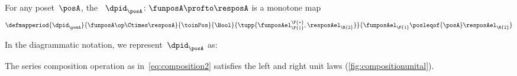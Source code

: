 \begin{definition}
    \label{def:dp-identity}
    For any poset~$\posA$, the \emph{}~$\dpid_\posA \colon \funposA \profto \resposA$ is a monotone map
    \begin{equation}
        \label{eq:identity}
        \defmapperiod{\dpid_\posA}{\funposA\op \Ctimes \resposA}{\toinPos}{\Bool}{\tupp{\funposAel_\F{1}^\F{*},\resposAel_\R{2}}}{\funposAel_\F{1} \posleqof{\posA} \resposAel_\R{2}}
    \end{equation}
\end{definition}
In the diagrammatic notation, we represent~$\dpid_\posA$ as:
%

\begin{lemma}
    \label{lem:compositionunital}
    The series composition operation as in~\cref{eq:composition2} satisfies the left and right unit laws (\cref{fig:compositionunital}).
\end{lemma}

